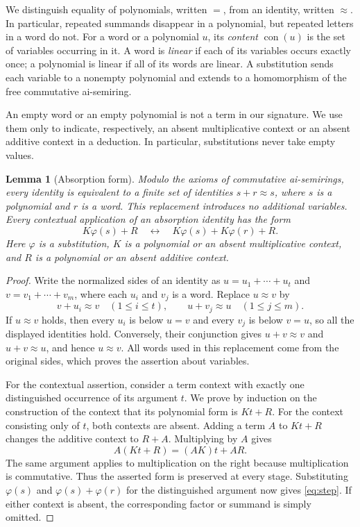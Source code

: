 \documentclass[11pt,reqno]{amsart}
\numberwithin{equation}{section}
\newtheorem{lemma}[theorem]{Lemma}
\theoremstyle{definition}
\theoremstyle{remark}
\DeclareMathOperator{\con}{con}
\newcommand{\eqid}{\approx}
\begin{document}
We distinguish equality of polynomials, written $=$, from an identity,
written $\eqid$. In particular, repeated summands disappear in a
polynomial, but repeated letters in a word do not. For a word or a
polynomial $u$, its \emph{content} $\con(u)$ is the set of variables
occurring in it. A word is \emph{linear} if each of its variables occurs
exactly once; a polynomial is linear if all of its words are linear.
A substitution sends each variable to a nonempty polynomial and
extends to a homomorphism of the free commutative ai-semiring.

An empty word or an empty polynomial is not a term in our signature.
We use them only to indicate, respectively, an absent multiplicative
context or an absent additive context in a deduction. In particular,
substitutions never take empty values.

\begin{lemma}[Absorption form]\label{lem:absorption}
Modulo the axioms of commutative ai-semirings, every identity is
equivalent to a finite set of identities $s+r\eqid s$, where $s$ is
a polynomial and $r$ is a word. This replacement introduces no
additional variables. Every contextual application of an absorption
identity has the form
\begin{equation}\label{eq:step}
K\varphi(s)+R
\quad\longleftrightarrow\quad
K\varphi(s)+K\varphi(r)+R.
\end{equation}
Here $\varphi$ is a substitution, $K$ is a polynomial or an absent
multiplicative context, and $R$ is a polynomial or an absent additive
context.
\end{lemma}

\begin{proof}
Write the normalized sides of an identity as
$u=u_1+\cdots+u_t$ and $v=v_1+\cdots+v_m$, where each $u_i$ and
$v_j$ is a word. Replace $u\eqid v$ by
\[
v+u_i\eqid v\quad(1\leq i\leq t),
\qquad
u+v_j\eqid u\quad(1\leq j\leq m).
\]
If $u\eqid v$ holds, then every $u_i$ is below $u=v$ and every
$v_j$ is below $v=u$, so all the displayed identities hold.
Conversely, their conjunction gives
$u+v\eqid v$ and $u+v\eqid u$, and hence $u\eqid v$.
All words used in this replacement come from the original sides,
which proves the assertion about variables.

For the contextual assertion, consider a term context with exactly
one distinguished occurrence of its argument $t$. We prove by induction
on the construction of the context that its polynomial form is $Kt+R$.
For the context consisting only of $t$, both contexts are absent.
Adding a term $A$ to $Kt+R$ changes the additive context to $R+A$.
Multiplying by $A$ gives
\[
A(Kt+R)=(AK)t+AR.
\]
The same argument applies to multiplication on the right because
multiplication is commutative. Thus the asserted form is preserved
at every stage. Substituting $\varphi(s)$ and
$\varphi(s)+\varphi(r)$ for the distinguished argument now gives
\eqref{eq:step}. If either context is absent, the corresponding
factor or summand is simply omitted.
\end{proof}
\end{document}
